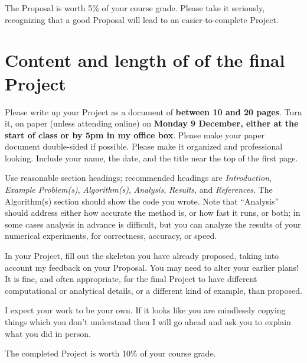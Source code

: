 \documentclass[11pt]{amsart}
\begin{document}
The Proposal is worth 5\% of your course grade.  Please take it seriously, recognizing that a good Proposal will lead to an easier-to-complete Project.


\section*{Content and length of of the final Project}  

Please write up your Project as a document of \textbf{between 10 and 20 pages}.  Turn it, on paper (unless attending online) on \textbf{{\color{BrickRed} Monday 9 December}, either at the start of class or by 5pm in my office box}.  Please make your paper document double-sided if possible.  Please make it organized and professional looking.  Include your name, the date, and the title near the top of the first page.

Use reasonable section headings; recommended headings are \emph{Introduction}, \emph{Example Problem(s)}, \emph{Algorithm(s)}, \emph{Analysis}, \emph{Results}, and \emph{References}.  The Algorithm(s) section should show the code you wrote.  Note that ``Analysis'' should address either how accurate the method is, or how fast it runs, or both; in some cases analysis in advance is difficult, but you can analyze the results of your numerical experiments, for correctness, accuracy, or speed.

In your Project, fill out the skeleton you have already proposed, taking into account my feedback on your Proposal.  You may need to alter your earlier plans!  It is fine, and often appropriate, for the final Project to have different computational or analytical details, or a different kind of example, than proposed.

I expect your work to be your own.  If it looks like you are mindlessly copying things which you don't understand then I will go ahead and ask you to explain what you did in person.

The completed Project is worth 10\% of your course grade.
\end{document}

